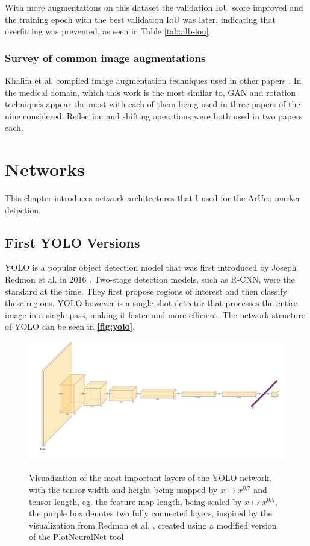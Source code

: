 \documentclass[10pt]{book}
\newcommand{\figureref}[1]{\textbf{\autoref{#1}}}
\begin{document}
With more augmentations on this dataset the validation \ac{IoU} score improved and the training epoch with the best validation \ac{IoU} was later, indicating that overfitting was prevented, as seen in Table \ref{tab:alb-iou}.

\subsection{Survey of common image augmentations}

Khalifa et al. compiled image augmentation techniques used in other papers \cite{khalifa2022comprehensive}. In the medical domain, which this work is the most similar to, \ac{GAN} and rotation techniques appear the most with each of them being used in three papers of the nine considered. Reflection and shifting operations were both used in two papers each.

\chapter{Networks}
\label{chap:netw}

This chapter introduces network architectures that I used for the \ac{ArUco} marker detection.

\section{First YOLO Versions}

\ac{YOLO} is a popular object detection model that was first introduced by Joseph Redmon et al. in 2016 \cite{redmon2016you}. Two-stage detection models, such as R-CNN, were the standard at the time. They first propose regions of interest and then classify these regions. \ac{YOLO} however is a single-shot detector that processes the entire image in a single pass, making it faster and more efficient. The network structure of \ac{YOLO} can be seen in \figureref{fig:yolo}.

\begin{figure}
  \caption{Visualization of the most important layers of the \ac{YOLO} network, with the tensor width and height being mapped by $x \mapsto x^{0.7}$ and tensor length, eg. the feature map length, being scaled by $x \mapsto x^{0.5}$, the purple box denotes two fully connected layers, inspired by the visualization from Redmon et al. \cite{redmon2016you}, created using a modified version of the \href{https://github.com/jnccd/PlotNeuralNet}{PlotNeuralNet tool} \cite{haris_iqbal_2018_2526396}}
  \includegraphics[width=\textwidth]{image/yolo}
  \label{fig:yolo}
\end{figure}
\end{document}
